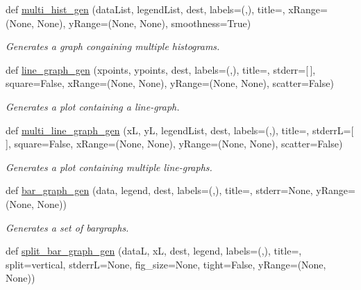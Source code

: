 \begin{DoxyCompactItemize}
def \hyperlink{namespacedynamicfilterapp_1_1simulation__files_1_1plot_script_a9b2bc9bb00f25db0e45c39b7c096dcf3}{multi\+\_\+hist\+\_\+gen} (data\+List, legend\+List, dest, labels=(\textquotesingle{}\textquotesingle{},\textquotesingle{}\textquotesingle{}), title=\textquotesingle{}\textquotesingle{}, x\+Range=(None, None), y\+Range=(None, None), smoothness=True)
\begin{DoxyCompactList}\small\item\em Generates a graph congaining multiple histograms. \end{DoxyCompactList}\item 
def \hyperlink{namespacedynamicfilterapp_1_1simulation__files_1_1plot_script_a2f9f1a1478f6aecc43e6e6dd0426906f}{line\+\_\+graph\+\_\+gen} (xpoints, ypoints, dest, labels=(\textquotesingle{}\textquotesingle{},\textquotesingle{}\textquotesingle{}), title=\textquotesingle{}\textquotesingle{}, stderr=\mbox{[}$\,$\mbox{]}, square=False, x\+Range=(None, None), y\+Range=(None, None), scatter=False)
\begin{DoxyCompactList}\small\item\em Generates a plot containing a line-\/graph. \end{DoxyCompactList}\item 
def \hyperlink{namespacedynamicfilterapp_1_1simulation__files_1_1plot_script_a647bf0080f13c14da1851fa89e12596b}{multi\+\_\+line\+\_\+graph\+\_\+gen} (xL, yL, legend\+List, dest, labels=(\textquotesingle{}\textquotesingle{},\textquotesingle{}\textquotesingle{}), title=\textquotesingle{}\textquotesingle{}, stderrL=\mbox{[}$\,$\mbox{]}, square=False, x\+Range=(None, None), y\+Range=(None, None), scatter=False)
\begin{DoxyCompactList}\small\item\em Generates a plot containing multiple line-\/graphs. \end{DoxyCompactList}\item 
def \hyperlink{namespacedynamicfilterapp_1_1simulation__files_1_1plot_script_a9da59b1b257e292c4a53c89baf4862ea}{bar\+\_\+graph\+\_\+gen} (data, legend, dest, labels=(\textquotesingle{}\textquotesingle{},\textquotesingle{}\textquotesingle{}), title=\textquotesingle{}\textquotesingle{}, stderr=None, y\+Range=(None, None))
\begin{DoxyCompactList}\small\item\em Generates a set of bargraphs. \end{DoxyCompactList}\item 
def \hyperlink{namespacedynamicfilterapp_1_1simulation__files_1_1plot_script_a8ffea8a8a4ebae3175cfb4d73d7be756}{split\+\_\+bar\+\_\+graph\+\_\+gen} (dataL, xL, dest, legend, labels=(\textquotesingle{}\textquotesingle{},\textquotesingle{}\textquotesingle{}), title=\textquotesingle{}\textquotesingle{}, split=\textquotesingle{}vertical\textquotesingle{}, stderrL=None, fig\+\_\+size=None, tight=False, y\+Range=(None, None))

\end{DoxyCompactItemize}
